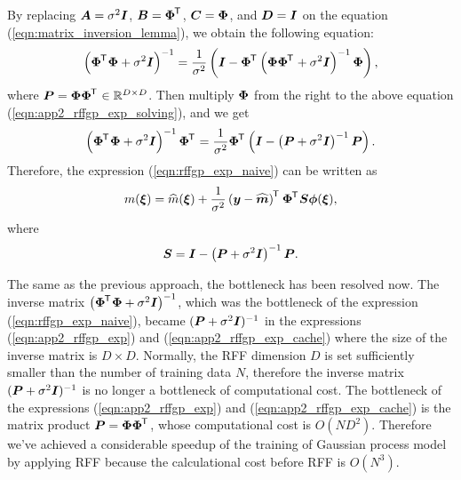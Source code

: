 \documentclass[twocolumn,a4paper,10pt]{article}
\begin{document}
By replacing $\boldsymbol{A} = \sigma^2 \boldsymbol{I}$, $\boldsymbol{B} = \boldsymbol{\Phi}^{\mkern-1.5mu\mathsf{T}}\hspace{0.5pt}$, $\boldsymbol{C} = \boldsymbol{\Phi}$,
and $\boldsymbol{D} = \boldsymbol{I}$ on the equation (\ref{eqn:matrix_inversion_lemma}),
we obtain the following equation:
\begin{equation}
    \left( \boldsymbol{\Phi}^{\mkern-1.5mu\mathsf{T}}\hspace{0.5pt} \boldsymbol{\Phi} + \sigma^2 \boldsymbol{I} \right)^{-1}
    = \frac{1}{\sigma^2} \left (\boldsymbol{I} - \boldsymbol{\Phi}^{\mkern-1.5mu\mathsf{T}}\hspace{0.5pt}
    \left( \boldsymbol{\Phi \Phi}^{\mkern-1.5mu\mathsf{T}}\hspace{0.5pt} + \sigma^2 \boldsymbol{I} \right)^{-1} \boldsymbol{\Phi} \right),
    \label{eqn:app2_rffgp_exp_solving}
\end{equation}
where $\boldsymbol{P} = \boldsymbol{\Phi \Phi}^{\mkern-1.5mu\mathsf{T}}\hspace{0.5pt} \in \mathbb{R}^{D \times D}$.
Then multiply $\boldsymbol{\Phi}$ from the right to the above equation (\ref{eqn:app2_rffgp_exp_solving}),
and we get
\begin{equation}
    \left( \boldsymbol{\Phi}^{\mkern-1.5mu\mathsf{T}}\hspace{0.5pt} \boldsymbol{\Phi} + \sigma^2 \boldsymbol{I} \right)^{-1} \boldsymbol{\Phi}^{\mkern-1.5mu\mathsf{T}}\hspace{0.5pt}
    = \frac{1}{\sigma^2} \boldsymbol{\Phi}^{\mkern-1.5mu\mathsf{T}}\hspace{0.5pt}
    \left( \boldsymbol{I} - \left( \boldsymbol{P} + \sigma^2 \boldsymbol{I} \right)^{-1} \boldsymbol{P} \right).
    \label{eqn:app2_rff_key_eqn}
\end{equation}
Therefore, the expression (\ref{eqn:rffgp_exp_naive}) can be written as
\begin{equation}
    m (\boldsymbol{\xi}) = \widehat{m} (\boldsymbol{\xi}) + \frac{1}{\sigma^2}
    \left( \boldsymbol{y} - \widehat{\boldsymbol{m}} \right)^{\mkern-1.5mu\mathsf{T}}\hspace{0.5pt} \boldsymbol{\Phi}^{\mkern-1.5mu\mathsf{T}}\hspace{0.5pt} \boldsymbol{S} \boldsymbol{\phi}(\boldsymbol{\xi}),
    \label{eqn:app2_rffgp_exp}
\end{equation}
where
\begin{equation}
    \boldsymbol{S} = \boldsymbol{I} - \left( \boldsymbol{P} + \sigma^2 \boldsymbol{I} \right)^{-1} \boldsymbol{P}.
    \label{eqn:app2_rffgp_exp_cache}
\end{equation}

The same as the previous approach, the bottleneck has been resolved now.
The inverse matrix $\bigl( \boldsymbol{\Phi}^{\mkern-1.5mu\mathsf{T}}\hspace{0.5pt} \boldsymbol{\Phi} + \sigma^2 \boldsymbol{I} \bigr)^{-1}$, which was
the bottleneck of the expression (\ref{eqn:rffgp_exp_naive}), became $(\boldsymbol{P} + \sigma^2 \boldsymbol{I})^{-1}$
in the expressions (\ref{eqn:app2_rffgp_exp}) and (\ref{eqn:app2_rffgp_exp_cache}) where the size of
the inverse matrix is $D \times D$. Normally, the RFF dimension $D$ is set sufficiently
smaller than the number of training data $N$, therefore the inverse matrix
$(\boldsymbol{P} + \sigma^2 \boldsymbol{I})^{-1}$ is no longer a bottleneck of computational cost.
The bottleneck of the expressions (\ref{eqn:app2_rffgp_exp}) and (\ref{eqn:app2_rffgp_exp_cache})
is the matrix product $\boldsymbol{P} = \boldsymbol{\Phi \Phi}^{\mkern-1.5mu\mathsf{T}}\hspace{0.5pt}$, whose computational cost is $O(ND^2)$.
Therefore we've achieved a considerable speedup of the training of Gaussian process model
by applying RFF because the calculational cost before RFF is $O(N^3)$.
\end{document}
